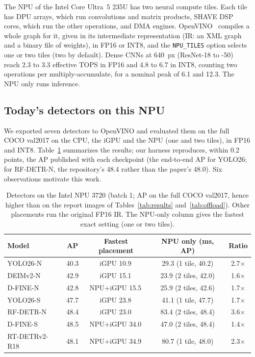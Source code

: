 \documentclass[conference]{IEEEtran}
\newcommand{\ms}{\,\text{ms}}
\begin{document}
The NPU of the Intel Core Ultra~5 235U has two neural compute tiles. Each tile has DPU arrays, which run convolutions and matrix products, SHAVE DSP cores, which run the other operations, and DMA engines. OpenVINO~\cite{openvino} compiles a whole graph for it, given in its intermediate representation (IR: an XML graph and a binary file of weights), in FP16 or INT8, and the \texttt{NPU\_TILES} option selects one or two tiles (two by default). Dense CNNs at 640~px (ResNet-18 to -50) reach 2.3 to 3.3 effective TOPS in FP16 and 4.8 to 6.7 in INT8, counting two operations per multiply-accumulate, for a nominal peak of 6.1 and 12.3. The NPU only runs inference.

\subsection{Today's detectors on this NPU}

We exported seven detectors to OpenVINO and evaluated them on the full COCO val2017 on the CPU, the iGPU and the NPU (one and two tiles), in FP16 and INT8. Table~\ref{tab:m0} summarizes the results; our harness reproduces, within 0.2 points, the AP published with each checkpoint (the end-to-end AP for YOLO26; for RF-DETR-N, the repository's 48.4 rather than the paper's 48.0). Six observations motivate this work.

\begin{table}[t]
\caption{Detectors on the Intel NPU 3720 (batch 1; AP on the full COCO val2017, hence higher than on the report images of Tables~\ref{tab:results} and~\ref{tab:offload}). Other placements run the original FP16 IR. The NPU-only column gives the fastest exact setting (one or two tiles).}
\label{tab:m0}
\centering
\footnotesize
\setlength{\tabcolsep}{4pt}
\begin{tabular}{@{}lcccc@{}}
\toprule
Model & AP & Fastest placement & NPU only (ms, AP) & Ratio \\
\midrule
YOLO26-N & 40.3 & iGPU 10.9\ms & 29.3 (1 tile, 40.2) & 2.7$\times$ \\
DEIMv2-N & 42.9 & iGPU 15.1\ms & 23.9 (2 tiles, 42.0) & 1.6$\times$ \\
D-FINE-N & 42.8 & NPU+iGPU 15.5\ms & 25.9 (2 tiles, 42.6) & 1.7$\times$ \\
YOLO26-S & 47.7 & iGPU 23.8\ms & 41.1 (1 tile, 47.7) & 1.7$\times$ \\
RF-DETR-N & 48.4 & iGPU 23.0\ms & 83.4 (2 tiles, 48.4) & 3.6$\times$ \\
D-FINE-S & 48.5 & NPU+iGPU 34.0\ms & 47.0 (2 tiles, 48.4) & 1.4$\times$ \\
RT-DETRv2-R18 & 48.1 & NPU+iGPU 34.9\ms & 80.7 (1 tile, 48.0) & 2.3$\times$ \\
\bottomrule
\end{tabular}
\end{table}
\end{document}
